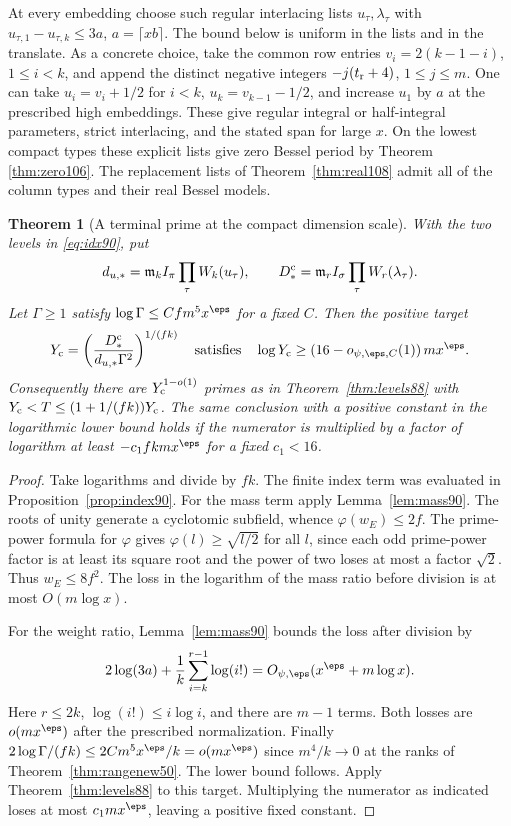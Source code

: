\documentclass[a4paper,11pt]{article}
\newtheorem{theorem}[proposition]{Theorem}
\theoremstyle{definition}
\theoremstyle{remark}
\numberwithin{equation}{section}
\begin{document}
At every embedding choose such regular interlacing lists
\(u_\tau,\lambda_\tau\) with \(u_{\tau,1}-u_{\tau,k}\le 3a\),
\(a=\lceil xb\rceil\). The bound below is uniform in the lists
and in the translate. As a concrete choice, take the common
row entries \(v_i=2(k-1-i)\), \(1\le i<k\), and append the
distinct negative integers \(-j(t_{\rm r}+4)\), \(1\le j\le m\).
One can take \(u_i=v_i+1/2\) for \(i<k\),
\(u_k=v_{k-1}-1/2\), and increase \(u_1\) by \(a\) at the
prescribed high embeddings. These give regular integral or
half-integral parameters, strict interlacing, and the stated
span for large \(x\). On the lowest compact types these explicit lists give zero Bessel period by Theorem \ref{thm:zero106}. The replacement lists of Theorem~\ref{thm:real108} admit all of the column types and their real Bessel models.

\begin{theorem}[A terminal prime at the compact dimension scale]
\label{thm:target90}
With the two levels in \eqref{eq:idx90}, put
\[
 d_{u,*}=\mathfrak m_k I_\pi\prod_{\tau}W_k(u_\tau),\qquad
 D_*^{\rm c}=\mathfrak m_r I_\sigma\prod_{\tau}W_r(\lambda_\tau).
\]
Let \(\Gamma\ge1\) satisfy \(\log\Gamma\le C f m^5 x^\eps\)
for a fixed \(C\). Then the positive target
\[
     Y_{\rm c}=\left(\frac{D_*^{\rm c}}
                                  {d_{u,*}\Gamma^2}\right)^{1/(fk)}
     \quad\hbox{satisfies}\quad
       \log Y_{\rm c}\ge(16-o_{\psi,\eps,C}(1))\,m x^\eps .
\]
Consequently there are \(Y_{\rm c}^{1-o(1)}\) primes as in
Theorem~\ref{thm:levels88} with
\(Y_{\rm c}<T\le(1+1/(fk))Y_{\rm c}\).
The same conclusion with a positive constant in the logarithmic
lower bound holds if the numerator is multiplied by a factor
of logarithm at least \(-c_1 fkm x^\eps\) for a fixed \(c_1<16\).
\end{theorem}
\begin{proof}
Take logarithms and divide by \(fk\). The finite index term
was evaluated in Proposition~\ref{prop:index90}. For the mass
term apply Lemma~\ref{lem:mass90}. The roots of unity generate
a cyclotomic subfield, whence \(\varphi(w_E)\le 2f\).
The prime-power formula for \(\varphi\) gives
\(\varphi(l)\ge\sqrt{l/2}\) for all \(l\), since each odd
prime-power factor is at least its square root and the power
of two loses at most a factor \(\sqrt2\). Thus \(w_E\le8f^2\).
The loss in the logarithm of the mass ratio before division
is at most \(O(m\log x)\).

For the weight ratio, Lemma~\ref{lem:mass90} bounds the loss
after division by
\[
     2\log(3a)+\frac1k\sum_{i=k}^{r-1}\log(i!)
                   =O_{\psi,\eps}(x^\eps+m\log x).
\]
Here \(r\le2k\), \(\log(i!)\le i\log i\), and there are
\(m-1\) terms. Both losses are \(o(m x^\eps)\) after the
prescribed normalization. Finally
\(2\log\Gamma/(fk)\le 2Cm^5 x^\eps/k=o(m x^\eps)\) since
\(m^4/k\to0\) at the ranks of Theorem~\ref{thm:rangenew50}.
The lower bound follows. Apply Theorem~\ref{thm:levels88}
to this target. Multiplying the numerator as indicated loses
at most \(c_1m x^\eps\), leaving a positive fixed constant.
\end{proof}
\end{document}
